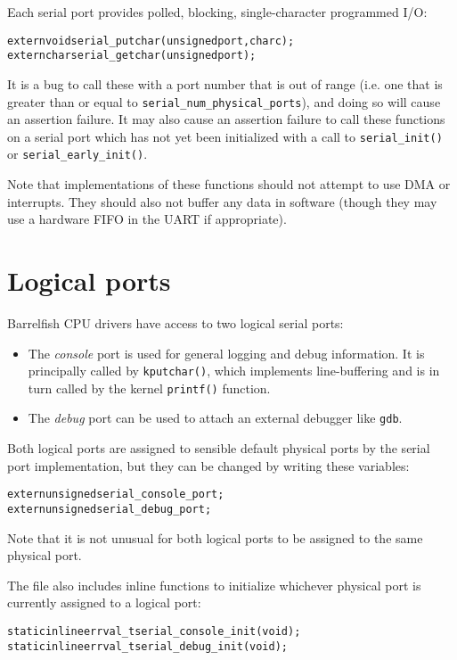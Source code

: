 \documentclass[a4paper,twoside]{report} %
\begin{document}
Each serial port provides polled, blocking, single-character
programmed I/O:
\begin{alltt}
  extern void serial\_putchar(unsigned port, char c);
  extern char serial\_getchar(unsigned port);
\end{alltt}
It is a bug to call these with a port number that is out of range
(i.e. one that is greater than or equal to
\texttt{serial\_num\_physical\_ports}), and doing so will cause an
assertion failure.  It may also cause an assertion failure to call
these functions on a serial port which has not yet been initialized
with a call to \texttt{serial\_init()} or
\texttt{serial\_early\_init()}. 

Note that implementations of these functions should not attempt to use
DMA or interrupts.  They should also not buffer any data in software
(though they may use a hardware FIFO in the UART if appropriate). 

\section{Logical ports}

Barrelfish CPU drivers have access to two logical serial ports: 
\begin{itemize}
\item The \emph{console} port is used for general logging and debug
  information.  It is principally called by \texttt{kputchar()}, which
  implements line-buffering and is in turn called by the kernel
  \texttt{printf()} function.
\item The \emph{debug} port can be used to attach an external debugger
  like \texttt{gdb}. 
\end{itemize}

Both logical ports are assigned to sensible default physical ports by
the serial port implementation, but they can be changed by writing
these variables:
\begin{alltt}
  extern unsigned serial\_console\_port;
  extern unsigned serial\_debug\_port;
\end{alltt}

Note that it is not unusual for both logical ports to be assigned to
the same physical port. 

The file \Intf also includes inline functions to initialize whichever
physical port is currently assigned to a logical port:
\begin{alltt}
  static inline errval\_t serial\_console\_init(void);
  static inline errval\_t serial\_debug\_init(void);
\end{alltt}
\end{document}

